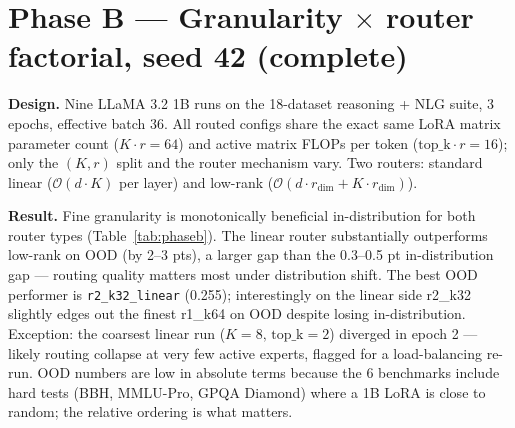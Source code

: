 \documentclass[10pt]{article}
\begin{document}
\section*{Phase B --- Granularity $\times$ router factorial, seed 42 (complete)}

\textbf{Design.} Nine LLaMA 3.2 1B runs on the 18-dataset reasoning + NLG suite, 3 epochs, effective batch 36. All routed configs share the exact same LoRA matrix parameter count ($K\cdot r {=} 64$) and active matrix FLOPs per token ($\text{top\_k}\cdot r {=} 16$); only the $(K, r)$ split and the router mechanism vary. Two routers: standard linear ($\mathcal{O}(d\cdot K)$ per layer) and low-rank ($\mathcal{O}(d\cdot r_{\text{dim}} + K\cdot r_{\text{dim}})$).

\textbf{Result.} Fine granularity is monotonically beneficial in-distribution for both router types (Table~\ref{tab:phaseb}). The linear router substantially outperforms low-rank on OOD (by 2--3 pts), a larger gap than the 0.3--0.5 pt in-distribution gap --- routing quality matters most under distribution shift. The best OOD performer is \texttt{r2\_k32\_linear} (0.255); interestingly on the linear side r2\_k32 slightly edges out the finest r1\_k64 on OOD despite losing in-distribution. Exception: the coarsest linear run ($K{=}8,\,\text{top\_k}{=}2$) diverged in epoch 2 --- likely routing collapse at very few active experts, flagged for a load-balancing re-run. OOD numbers are low in absolute terms because the 6 benchmarks include hard tests (BBH, MMLU-Pro, GPQA Diamond) where a 1B LoRA is close to random; the relative ordering is what matters.
\end{document}
